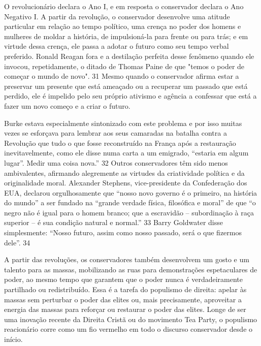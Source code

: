 O revolucionário declara o Ano I, e em resposta o conservador declara o Ano Negativo I. A partir da revolução, o conservador desenvolve uma atitude particular em relação ao tempo político, uma crença no poder dos homens e mulheres de moldar a história, de impulsioná-la para frente ou para trás; e em virtude dessa crença, ele passa a adotar o futuro como seu tempo verbal preferido. Ronald Reagan fora e a destilação perfeita desse fenômeno quando ele invocou, repetidamente, o ditado de Thomas Paine de que "temos o poder de começar o mundo de novo".
 {\color{blue} 31}  
Mesmo quando o conservador afirma estar a preservar um presente que está ameaçado ou a recuperar um passado que está perdido, ele é impelido pelo seu próprio ativismo e agência a confessar que está a fazer um novo começo e a criar o futuro.
 
\par
 
Burke estava especialmente sintonizado com este problema e por isso muitas vezes se esforçava para lembrar aos seus camaradas na batalha contra a Revolução que tudo o que fosse reconstruído na França após a restauração inevitavelmente, como ele disse numa carta a um emigrado, “estaria em algum lugar”. Medir uma coisa nova.”
 {\color{blue} 32}  
Outros conservadores têm sido menos ambivalentes, afirmando alegremente as virtudes da criatividade política e da originalidade moral. Alexander Stephens, vice-presidente da Confederação dos EUA, declarou orgulhosamente que “nosso novo governo é o primeiro, na história do mundo” a ser fundado na “grande verdade física, filosófica e moral” de que “o negro não é igual para o homem branco; que a escravidão – subordinação à raça superior – é sua condição natural e normal.”
 {\color{blue} 33}  
Barry Goldwater disse simplesmente: “Nosso futuro, assim como nosso passado, será o que fizermos dele”.
 {\color{blue} 34}  

 
\par
 
A partir das revoluções, os conservadores também desenvolvem um gosto e um talento para as massas, mobilizando as ruas para demonstrações espetaculares de poder, ao mesmo tempo que garantem que o poder nunca é verdadeiramente partilhado ou redistribuído. Essa é a tarefa do populismo de direita: apelar às massas sem perturbar o poder das elites ou, mais precisamente, aproveitar a energia das massas para reforçar ou restaurar o poder das elites. Longe de ser uma inovação recente da Direita Cristã ou do movimento Tea Party, o populismo reacionário corre como um fio vermelho em todo o discurso conservador desde o início.
 
